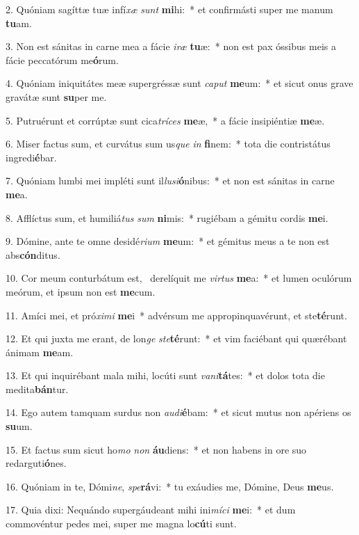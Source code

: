 2. Quóniam sagíttæ tuæ infí\textit{xæ} \textit{sunt} \textbf{mi}hi:~*  et confirmásti super me manum \textbf{tu}am.\

3. Non est sánitas in carne mea a fácie \textit{i}\textit{ræ} \textbf{tu}æ:~*  non est pax óssibus meis a fácie peccatórum me\textbf{ó}rum.\

4. Quóniam iniquitátes meæ supergréssæ sunt \textit{ca}\textit{put} \textbf{me}um:~*  et sicut onus grave gravátæ sunt \textbf{su}per me.\

5. Putruérunt et corrúptæ sunt cica\textit{trí}\textit{ces} \textbf{me}æ,~*  a fácie insipiéntiæ \textbf{me}æ.\

6. Miser factus sum, et curvátus sum us\textit{que} \textit{in} \textbf{fi}nem:~*  tota die contristátus ingredi\textbf{é}bar.\

7. Quóniam lumbi mei impléti sunt il\textit{lu}\textit{si}\textbf{ó}nibus:~*  et non est sánitas in carne \textbf{me}a.\

8. Afflíctus sum, et humiliá\textit{tus} \textit{sum} \textbf{ni}mis:~*  rugiébam a gémitu cordis \textbf{me}i.\

9. Dómine, ante te omne desidé\textit{ri}\textit{um} \textbf{me}um:~*  et gémitus meus a te non est abs\textbf{cón}ditus.\

10. Cor meum conturbátum est, \dag\  derelíquit me \textit{vir}\textit{tus} \textbf{me}a:~*  et lumen oculórum meórum, et ipsum non est \textbf{me}cum.\

11. Amíci mei, et pró\textit{xi}\textit{mi} \textbf{me}i~*  advérsum me appropinquavérunt, et ste\textbf{té}runt.\

12. Et qui juxta me erant, de lon\textit{ge} \textit{ste}\textbf{té}runt:~*  et vim faciébant qui quærébant ánimam \textbf{me}am.\

13. Et qui inquirébant mala mihi, locúti sunt \textit{va}\textit{ni}\textbf{tá}tes:~*  et dolos tota die medita\textbf{bán}tur.\

14. Ego autem tamquam surdus non \textit{au}\textit{di}\textbf{é}bam:~*  et sicut mutus non apériens os \textbf{su}um.\

15. Et factus sum sicut ho\textit{mo} \textit{non} \textbf{áu}diens:~*  et non habens in ore suo redarguti\textbf{ó}nes.\

16. Quóniam in te, Dómi\textit{ne}, \textit{spe}\textbf{rá}vi:~*  tu exáudies me, Dómine, Deus \textbf{me}us.\

17. Quia dixi: Nequándo supergáudeant mihi ini\textit{mí}\textit{ci} \textbf{me}i:~*  et dum commovéntur pedes mei, super me magna lo\textbf{cú}ti sunt.\

